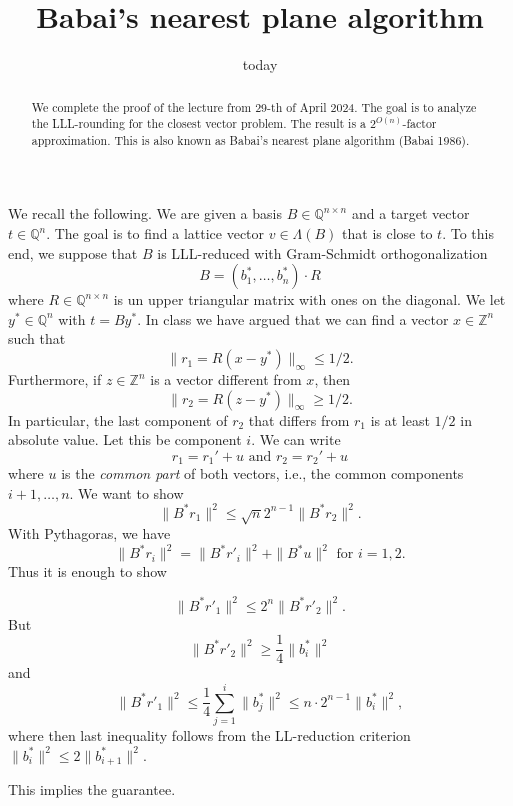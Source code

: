 \documentclass[11pt,a4paper]{article}
\title{Babai's nearest plane algorithm}
\date{ today}
\begin{document}
\maketitle
\begin{abstract}
  \noindent 
  We complete the proof of the lecture from 29-th of April 2024. The goal is to analyze the LLL-rounding for the closest vector problem. The result is a $2^{O(n)}$-factor approximation. This is also known as Babai's nearest plane algorithm (Babai 1986). 
\end{abstract}



\noindent 
We recall the following. We are given a basis $B ∈ ℚ^{n ×n}$ and a target vector $t ∈ ℚ^n$. The goal is to find a lattice vector $v ∈ Λ(B)$  that is close to $t$. To this end, we suppose that $B$ is LLL-reduced with Gram-Schmidt orthogonalization
\begin{displaymath}
  B = \left( b_1^*,\dots,b_n^* \right) ⋅ R
\end{displaymath}
where $R∈ ℚ^{n × n}$ is un upper triangular matrix with ones on the diagonal. We let $y^* ∈ ℚ^n$ with $t = B y^*$. In class we have argued that we can find a vector $x ∈ℤ^n$ such that
\begin{equation}
  \label{eq:1}
  \| r_1 =  R (x - y^*)\|_∞ ≤ 1/2. 
\end{equation}
Furthermore, if $z ∈ℤ^n$ is a vector different from $x$, then
\begin{equation}
  \label{eq:1}
  \| r_2 = R (z - y^*)\|_∞ ≥ 1/2. 
\end{equation}
In particular, the last component of $r_2$ that differs from $r_1$   is at least $1/2$ in absolute value. Let this be component $i$. We can write
\begin{displaymath}
  r_1 = r_1' + u \text{ and }  r_2 = r_2' + u 
\end{displaymath}
where $u$ is the \emph{common part} of both vectors, i.e., the common components $i+1,\dots,n$.  We want to show 
\begin{displaymath}
 \| B^* r_1  \|^2 ≤ \sqrt{n} 2^{n-1} \| B^* r_2  \|^2. 
\end{displaymath}
With Pythagoras, we have
\begin{displaymath}
  \| B^* r_i  \|^2 =  \| B^* r'_i  \|^2 +  \| B^* u  \|^2  \text{ for }i=1,2. 
\end{displaymath}
Thus it is enough to show 

\begin{displaymath}
 \| B^* r'_1  \|^2 ≤ 2^{n} \| B^* r'_2  \|^2. 
\end{displaymath}
But
\begin{displaymath}
  \| B^* r'_2  \|^2 ≥ \frac{1}{4} \|b_i^*\|^2 
\end{displaymath}
and
\begin{displaymath}
   \| B^* r'_1  \|^2 ≤ \frac{1}{4} ∑_{j=1}^i \|b_j^*\|^2 ≤ n ⋅ 2^{n-1} \|b_i^*\|^2 ,
\end{displaymath}
where then last inequality follows from the LL-reduction criterion $\|b_i^*\|^2 ≤ 2 \|b_{i+1}^*\|^2$.

This implies the guarantee. 


%
%

 
\end{document}
